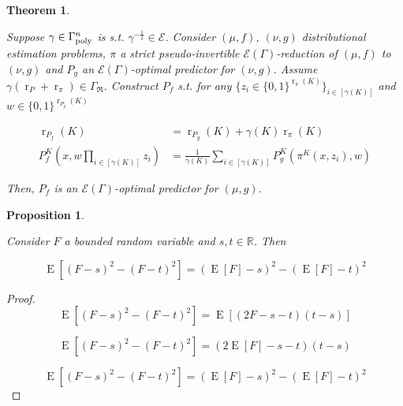 \documentclass{article}
\numberwithin{equation}{section}
\theoremstyle{definition}
\theoremstyle{plain}
\newtheorem{theorem}{Theorem}[section]
\newtheorem{proposition}{Proposition}[section]
\newcommand{\Bool}{\{0,1\}}
\DeclareMathOperator{\E}{E}
\DeclareMathOperator{\R}{r}
\newcommand{\Reals}{\mathbb{R}}
\newcommand{\GrowR}{\Gamma_{\mathfrak{R}}}
\newcommand{\Fall}{\mathcal{E}}
\newcommand{\EG}{\Fall(\Gamma)}
\newcommand{\BoolR}[1]{\Bool^{\R_{#1}(K)}}
\begin{document}
\begin{samepage}
\begin{theorem}
\label{thm:sp_reduce}

Suppose $\gamma \in \Gamma_{\textnormal{poly}}^n$ is s.t. $\gamma^{-\frac{1}{2}} \in \Fall$. Consider $(\mu,f)$, $(\nu,g)$ distributional estimation problems, $\pi$ a strict pseudo-invertible $\EG$-reduction of $(\mu, f)$ to $(\nu, g)$ and $P_g$ an $\EG$-optimal predictor for $(\nu, g)$. Assume $\gamma (\R_P + \R_\pi) \in \GrowR$. Construct ${P_f}$  s.t. for any ${\{z_i \in \BoolR{\pi}\}_{i \in [\gamma(K)]}}$ and ${w \in \BoolR{P_g}}$

\begin{align}
\label{eqn:thm__sp_reduce__rpf}\R_{P_f}(K) &= \R_{P_g}(K) + \gamma(K) \R_\pi(K) \\
\label{eqn:thm__sp_reduce__pf}P_f^K(x, w \prod_{i \in [\gamma(K)]} z_i) &= \frac{1}{\gamma(K)}\sum_{i \in [\gamma(K)]} P_g^K(\pi^K(x,z_i),w)
\end{align}


Then, $P_f$ is an $\EG$-optimal predictor for ${(\mu,g)}$.

\end{theorem}
\end{samepage}

\begin{samepage}
\begin{proposition}
\label{prp:ev_diff_sq}

Consider ${F}$ a bounded random variable and ${s,t \in \Reals}$. Then

\begin{equation}
\E[(F - s)^2 - (F - t)^2] = (\E[F] - s)^2 - (\E[F] - t)^2
\end{equation}

\end{proposition}
\end{samepage}

\begin{proof}

\[\E[(F - s)^2 - (F - t)^2] = \E[(2F - s - t)(t-s)]\]

\[\E[(F - s)^2 - (F - t)^2] = (2\E[F] - s - t)(t-s)\]

\[\E[(F - s)^2 - (F - t)^2] = (\E[F] - s)^2 - (\E[F] - t)^2\]
%
\end{proof}
\end{document}
